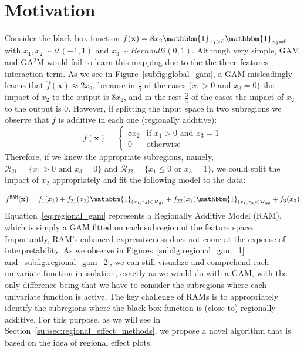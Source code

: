 \documentclass[runningheads]{llncs}
\newcommand{\xb}{\mathbf{x}}
\newcommand{\when}[1]{\mathbbm{1}_{#1}}
\begin{document}
\section{Motivation}
\label{sec:motivation}

Consider the black-box function \(f(\xb) = 8x_2\when{x_1 > 0}\when{x_3=0}\)
with \(x_1, x_2 \sim \mathcal{U}(-1,1)\) and \(x_3 \sim Bernoulli(0,1)\).
Although very simple, GAM and GA$^2$M would fail to learn this mapping due to
the the three-features interaction term.
As we see in Figure~\ref{subfig:global_gam}, a GAM misleadingly learns that $\hat{f}(\xb) \approx 2x_2$,
because in $\frac{1}{4}$ of the cases ($x_1 > 0 \text{ and } x_3 = 0$) the impact of $x_2$ to the output is $8x_2$,
and in the rest $\frac{3}{4}$ of the cases the impact of $x_2$ to the output is $0$.
However, if splitting the input space in two subregions we observe that \(f\) is additive in each one (regionally additive):
%
\begin{equation}
    \label{eq:regionally_additive}
    f(\xb) = \begin{cases} 8x_2 & \text{if } x_1 > 0 \text{ and } x_3 = 1 \\ 0 & \text{otherwise} \end{cases}
\end{equation}
%
Therefore, if we knew the appropriate subregions,
namely, \(\mathcal{R}_{21} = \{x_1 > 0 \text{ and } x_3 = 0\}\)
and  \(\mathcal{R}_{22} = \{x_1 \leq 0 \text{ or } x_3 = 1\}\),
we could split the impact of $x_2$ appropriately and fit the following model to the data:

\begin{equation}
    \label{eq:regional_gam}
    f^{\mathtt{RAM}}(\xb) = f_1(x_1) + f_{21}(x_2) \when{(x_1, x_3) \in \mathcal{R}_{21}} + f_{22}(x_2) \when{(x_1, x_3) \in \mathcal{R}_{22}} + f_3(x_3)
\end{equation}
%
Equation~\eqref{eq:regional_gam} represents a Regionally Additive Model (RAM), which is simply a GAM fitted on each subregion of the feature space.
Importantly, RAM's enhanced expressiveness does not come at the expense of interpretability.
As we observe in Figures~\ref{subfig:regional_gam_1} and~\ref{subfig:regional_gam_2}, we can still visualize and comprehend each univariate function in isolation, exactly as we would do with a GAM,
with the only difference being that we have to consider the subregions where each univariate function is active,
The key challenge of RAMs is to appropriately identify the subregions where the black-box function is (close to) regionally additive.
For this purpose, as we will see in Section~\ref{subsec:regional_effect_methods}, we propose a novel algorithm that is based on the idea of
regional effect plots.
\end{document}
